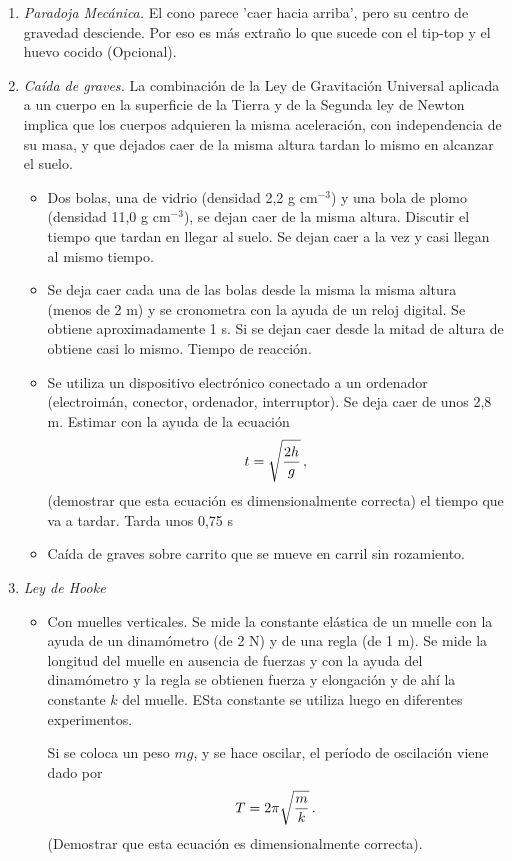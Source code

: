 \documentclass[11pt]{articulo}
\begin{document}
\begin{enumerate}
\item {\it Paradoja Mec\'anica.} El cono parece 'caer hacia arriba', pero su centro de gravedad desciende. Por eso es m\'as extra\~no lo que sucede con el tip-top y el huevo cocido (Opcional).
\item {\it Ca\'ida de graves.} La combinaci\'on de la Ley de Gravitaci\'on Universal aplicada a un cuerpo en la superficie de la Tierra y de la Segunda ley de Newton implica que los cuerpos adquieren la misma aceleraci\'on, con independencia de su masa, y que dejados caer de la misma altura tardan lo mismo en alcanzar el suelo.
  \begin{itemize}
  \item Dos bolas, una de vidrio (densidad 2,2 g cm$^{-3}$) y una bola de plomo (densidad 11,0 g cm$^{-3}$), se dejan caer de la misma altura. Discutir el tiempo que tardan en llegar al suelo. Se dejan caer a la vez y casi llegan al mismo tiempo.
  \item Se deja caer cada una de las bolas desde la misma la misma altura (menos de 2 m) y se cronometra con la ayuda de un reloj digital.  Se obtiene aproximadamente 1 s.  Si se dejan caer desde la mitad de altura de obtiene casi lo mismo. Tiempo de reacci\'on.
  \item Se utiliza un dispositivo electr\'onico conectado a un ordenador (electroim\'an, conector, ordenador, interruptor). Se deja caer de unos 2,8 m. Estimar con la ayuda de la ecuaci\'on
$$t = \sqrt{2h\over g}\, ,$$
    (demostrar que esta ecuaci\'on es dimensionalmente correcta) el tiempo que va a tardar.
    Tarda unos 0,75 s
  \item Ca\'ida de graves sobre carrito que se mueve en carril sin rozamiento.
  \end{itemize}

\item {\it Ley de Hooke}
  \begin{itemize}
  \item Con muelles verticales. Se mide la constante el\'astica de un muelle con la ayuda de un dinam\'ometro (de 2 N) y de una regla (de 1 m). Se mide la longitud del muelle en ausencia de fuerzas y con la ayuda del dinam\'ometro y la regla se obtienen fuerza y elongaci\'on y de ah\'i la constante $k$ del muelle. ESta constante se utiliza luego en diferentes experimentos.  

Si se coloca un peso $mg$, y se hace oscilar, el per\'iodo de oscilaci\'on viene dado por
$$T = 2 \pi \sqrt{m\over k}\, .$$
(Demostrar que esta ecuaci\'on es dimensionalmente correcta).


\end{itemize}
\end{enumerate}
\end{document}

